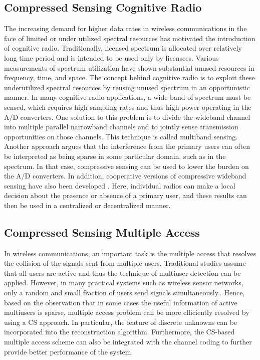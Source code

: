 \subsection{Compressed Sensing Cognitive Radio}
The increasing demand for higher data rates in wireless communications in the face of limited or under utilized spectral resources has motivated the introduction of cognitive radio. Traditionally, licensed spectrum is allocated over relatively long time period and is intended to be used only by licensees. Various measurements of spectrum utilization have shown substantial unused resources in frequency, time, and space\cite{axell2012spectrum}. The concept behind cognitive radio is to exploit these underutilized spectral resources by reusing unused spectrum in an opportunistic manner. In many cognitive radio applications, a wide band of spectrum must be sensed, which requires high sampling rates and thus high power operating in the A/D converters. One solution to this problem is to divide the wideband channel into multiple parallel narrowband channels and to jointly sense transmission opportunities on those channels. This technique is called multiband sensing. Another approach argues that the interference from the primary users can often be interpreted as being sparse in some particular domain, such as in the spectrum. In that case, compressive sensing can be used to lower the burden on the A/D converters. In addition, cooperative versions of compressive wideband sensing have also been developed \cite{tian2008compressed,wang2009distributed}. Here, individual radios can make a local decision about the presence or absence of a primary user, and these results can then be used in a centralized or decentralized manner.

\subsection{Compressed Sensing Multiple Access}
In wireless communications, an important task is the multiple access that resolves the collision of the signals sent from multiple users. Traditional studies assume that all users are active and thus the technique of multiuser detection can be applied. However, in many practical systems such as wireless sensor networks, only a random and small fraction of users send signals simultaneously.. Hence, based on the observation that in some cases the useful information of active multiusers is sparse, multiple access problem can be more efficiently resolved by using a CS approach. In particular, the feature of discrete unknowns can be incorporated into the reconstruction algorithm. Furthermore, the CS-based multiple access scheme can also be integrated with the channel coding to further provide better performance of the system.
